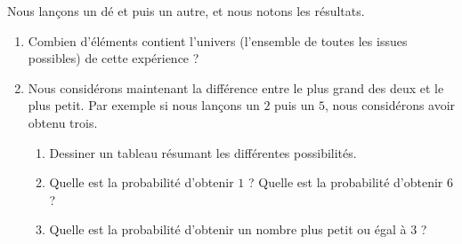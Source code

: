 
\begin{exercice}%
    \label{exosmath-0357}

    Nous lançons un dé et puis un autre, et nous notons les résultats.
    \begin{enumerate}
        \item
            Combien d'éléments contient l'univers (l'ensemble de toutes les issues possibles) de cette expérience ? 
        \item
            Nous considérons maintenant la différence entre le plus grand des deux et le plus petit. Par exemple si nous lançons un \( 2\) puis un \( 5\), nous considérons avoir obtenu trois. 
            \begin{enumerate}
                \item 
            Dessiner un tableau résumant les différentes possibilités.
                \item
                   Quelle est la probabilité d'obtenir \( 1\) ? Quelle est la probabilité d'obtenir \( 6\) ?
                \item
                    Quelle est la probabilité d'obtenir un nombre plus petit ou égal à \( 3\) ?
            \end{enumerate}
    \end{enumerate}

\end{exercice}
